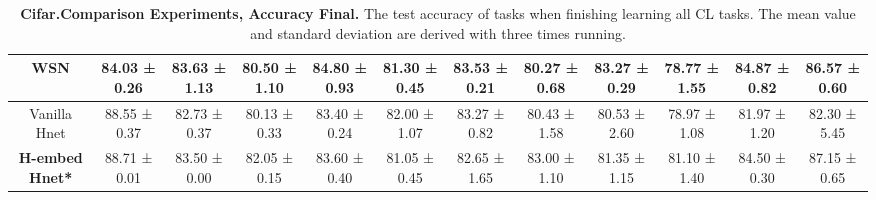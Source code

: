 \begin{sidewaystable}[ht]
\begin{adjustbox}{max width=\textwidth}
\begin{tabular}{|c|c|c|c|c|c|c|c|c|c|c|c|}
\hline
WSN & 84.03 ± 0.26 & 83.63 ± 1.13 & 80.50 ± 1.10 & 84.80 ± 0.93 & 81.30 ± 0.45 & 83.53 ± 0.21 & 80.27 ± 0.68 & 83.27 ± 0.29 & 78.77 ± 1.55 & 84.87 ± 0.82 & 86.57 ± 0.60 \\
\hline
Vanilla Hnet & 88.55 ± 0.37 & 82.73 ± 0.37 & 80.13 ± 0.33 & 83.40 ± 0.24 & 82.00 ± 1.07 & 83.27 ± 0.82 & 80.43 ± 1.58 & 80.53 ± 2.60 & 78.97 ± 1.08 & 81.97 ± 1.20 & 82.30 ± 5.45 \\
\hline
\textbf{H-embed Hnet*} &  88.71 ± 0.01 & 83.50 ± 0.00 & 82.05 ± 0.15 & 83.60 ± 0.40 & 81.05 ± 0.45 & 82.65 ± 1.65 & 83.00 ± 1.10 & 81.35 ± 1.15 & 81.10 ± 1.40 & 84.50 ± 0.30 & 87.15 ± 0.65 \\

\hline
\end{tabular}
\end{adjustbox}
\caption{\textbf{Cifar.Comparison Experiments, Accuracy Final.} The test accuracy of tasks when finishing learning all CL tasks. The mean value and standard deviation are derived with three times running.}
\end{sidewaystable}

